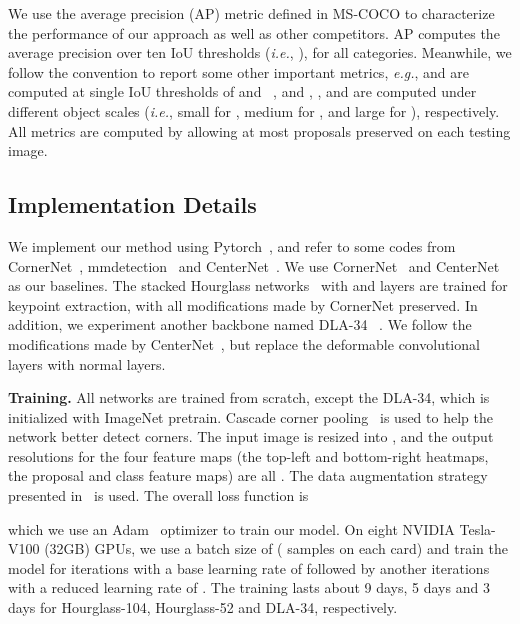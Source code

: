 \documentclass[runningheads]{llncs}
\begin{document}
We use the average precision (AP) metric defined in MS-COCO to characterize the performance of our approach as well as other competitors. AP computes the average precision over ten IoU thresholds (\textit{i.e.}, ), for all categories. Meanwhile, we follow the convention to report some other important metrics, \textit{e.g.},  and  are computed at single IoU thresholds of  and ~\cite{everingham2010pascal}, and , , and  are computed under different object scales (\textit{i.e.}, small for , medium for , and large for ), respectively. All metrics are computed by allowing at most  proposals preserved on each testing image.
\vspace{-1ex}
\subsection{Implementation Details}
\label{Experiments:Details}
We implement our method using Pytorch~\cite{paszke2017automatic}, and refer to some codes from CornerNet~\cite{law2018cornernet}, mmdetection~\cite{mmdetection} and CenterNet~\cite{zhou2019objects}. We use CornerNet~\cite{law2018cornernet} and CenterNet~\cite{duan2019centernet} as our baselines. The stacked Hourglass networks~\cite{newell2016stacked} with  and  layers are trained for keypoint extraction, with all modifications made by CornerNet preserved. In addition, we experiment another backbone named DLA-34 ~\cite{yu2018deep}. We follow the modifications made by CenterNet~\cite{zhou2019objects}, but replace the deformable convolutional layers with normal layers.

\noindent\textbf{Training.} All networks are trained from scratch, except the DLA-34, which is initialized with ImageNet pretrain. Cascade corner pooling~\cite{duan2019centernet} is used to help the network better detect corners. The input image is resized into , and the output resolutions for the four feature maps (the top-left and bottom-right heatmaps, the proposal and class feature maps) are all . The data augmentation strategy presented in~\cite{law2018cornernet} is used. The overall loss function is

which we use an Adam~\cite{kingma2014adam} optimizer to train our model. On eight NVIDIA Tesla-V100 (32GB) GPUs, we use a batch size of  ( samples on each card) and train the model for  iterations with a base learning rate of  followed by another  iterations with a reduced learning rate of . The training lasts about 9 days, 5 days and 3 days for Hourglass-104, Hourglass-52 and DLA-34, respectively.
\end{document}
